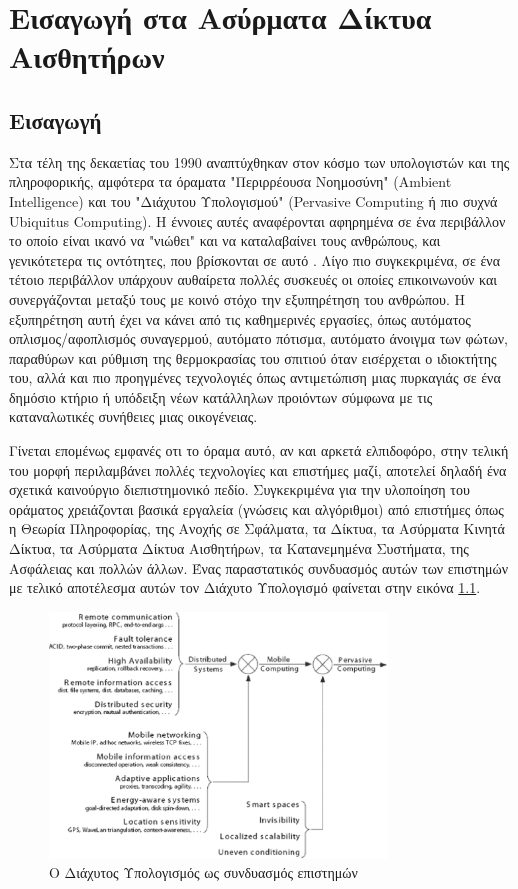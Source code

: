 


\chapter{Εισαγωγή στα Ασύρματα Δίκτυα Αισθητήρων}\label{ch:intro-wsns}

\section{Εισαγωγή}
Στα τέλη της δεκαετίας του 1990 αναπτύχθηκαν στον κόσμο των υπολογιστών και της πληροφορικής, αμφότερα τα όραματα "Περιρρέουσα Νοημοσύνη" (Ambient Intelligence) και
του "Διάχυτου Υπολογισμού" (Pervasive Computing ή πιο συχνά Ubiquitus Computing).
Η έννοιες αυτές αναφέρονται αφηρημένα σε ένα περιβάλλον το οποίο είναι ικανό να "νιώθει" και να καταλαβαίνει τους ανθρώπους, και γενικότετερα
τις οντότητες, που βρίσκονται σε αυτό \cite{ambient}.
Λίγο πιο συγκεκριμένα, σε ένα τέτοιο περιβάλλον υπάρχουν αυθαίρετα πολλές συσκευές οι οποίες επικοινωνούν και συνεργάζονται μεταξύ τους με κοινό στόχο την εξυπηρέτηση
του ανθρώπου.
Η εξυπηρέτηση αυτή έχει να κάνει από τις καθημερινές εργασίες, όπως αυτόματος οπλισμος/αφοπλισμός συναγερμού, αυτόματο πότισμα, αυτόματο άνοιγμα των φώτων, παραθύρων
και ρύθμιση της θερμοκρασίας του σπιτιού όταν εισέρχεται ο ιδιοκτήτης του, αλλά και πιο προηγμένες τεχνολογιές όπως αντιμετώπιση μιας πυρκαγιάς σε ένα δημόσιο κτήριο
ή υπόδειξη νέων κατάλληλων
προιόντων σύμφωνα με τις καταναλωτικές συνήθειες μιας οικογένειας.

Γίνεται επομένως εμφανές οτι το όραμα αυτό, αν και αρκετά ελπιδοφόρο, στην τελική του μορφή περιλαμβάνει πολλές τεχνολογίες και επιστήμες μαζί, αποτελεί δηλαδή ένα
σχετικά καινούργιο διεπιστημονικό πεδίο.
Συγκεκριμένα για την υλοποίηση του οράματος χρειάζονται βασικά εργαλεία (γνώσεις και αλγόριθμοι) από επιστήμες όπως η Θεωρία Πληροφορίας, της Ανοχής σε Σφάλματα,
τα Δίκτυα, τα Ασύρματα Κινητά Δίκτυα, τα Ασύρματα Δίκτυα Αισθητήρων, τα Κατανεμημένα Συστήματα, της Ασφάλειας και πολλών άλλων. Ένας παραστατικός συνδυασμός αυτών
των επιστημών με τελικό αποτέλεσμα αυτών τον Διάχυτο Υπολογισμό φαίνεται στην εικόνα \ref{fig:pervasive}.

\begin{figure}[h]
  \centering
  \includegraphics[width=0.8\textwidth]{images/pervasive_computing.eps}
  \caption[Caption for LOF]{Ο Διάχυτος Υπολογισμός ως συνδυασμός επιστημών\footnotemark}
  \label{fig:pervasive}
\end{figure}

